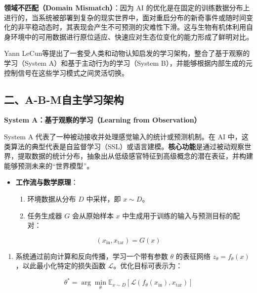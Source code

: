 \textbf{领域不匹配（Domain Mismatch）}：因为 AI 的优化是在固定的训练数据分布上进行的，当系统被部署到复杂的现实世界中，面对重启分布的新奇事件或随时间变化的非平稳动态时，其表现会产生不可预测的灾难性下滑。这与生物有机体利用自身环境中的可用数据进行原位适应、快速应对生态位变化的能力形成了鲜明对比。

Yann LeCun等提出了一套受人类和动物认知启发的学习架构，整合了基于观察的学习（System A）和基于主动行为的学习（System B），并能够根据内部生成的元控制信号在这些学习模式之间灵活切换。

\hypertarget{ux4e8ca-b-mux81eaux4e3bux5b66ux4e60ux67b6ux6784}{%
\subsection{二、A-B-M自主学习架构}\label{ux4e8ca-b-mux81eaux4e3bux5b66ux4e60ux67b6ux6784}}

\textbf{System A：基于观察的学习（Learning from Observation）}

System A 代表了一种被动接收并处理感觉输入的统计或预测机制。在 AI 中，这类算法的典型代表是自监督学习（SSL）或语言建模。\textbf{核心功能}是通过被动观察世界，提取数据的统计分布，抽象出从低级感官特征到高级概念的潜在表征，并构建能够预测未来的``世界模型''。

\begin{itemize}
\tightlist
\item
  \textbf{工作流与数学原理}：

  \begin{enumerate}
  \def\labelenumi{\arabic{enumi}.}
  \tightlist
  \item
    环境数据从分布 \(D\) 中采样，即 \(x\sim D\)。
  \item
    任务生成器 \(G\) 会从原始样本 \(x\) 中生成用于训练的输入与预测目标的配对：
  \end{enumerate}
\end{itemize}

\[
(x_{\mathrm{in}},x_{\mathrm{tar}})=G(x)
\]

\begin{enumerate}
\def\labelenumi{\arabic{enumi}.}
\setcounter{enumi}{2}
\tightlist
\item
  系统通过前向计算和反向传播，学习一个带有参数 \(\theta\) 的表征网络 \(z_\theta=f_\theta(x)\)，以此最小化特定的损失函数 \(\mathcal{L}\)。优化目标可表示为：
\end{enumerate}

\[
\theta^* = \arg\min_\theta
\mathbb{E}_{x\sim D}
\left[
\mathcal{L}\left(f_\theta(x_{\mathrm{in}}),x_{\mathrm{tar}}\right)
\right]
\]

